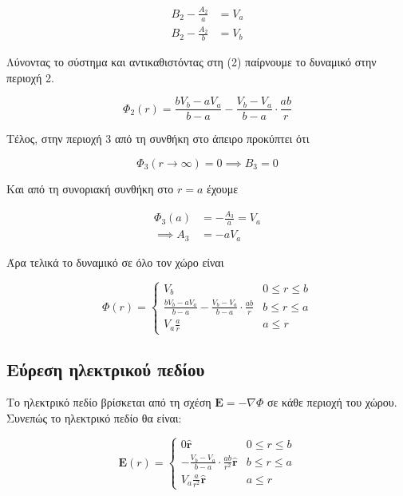 \begin{equation} \label{eq1}
\begin{split}
  B_{2} - \frac{A_{2}}{a} & = V_{a} \\
  B_{2} - \frac{A_{2}}{b} & = V_{b}
\end{split}
\end{equation}

Λύνοντας το σύστημα και αντικαθιστόντας στη (2) παίρνουμε το δυναμικό στην περιοχή 2.

\[ \Phi_{2}(r) = \frac{bV_{b} - aV_{a}}{b - a} - \frac{V_{b} - V_{a}}{b-a}\cdot\frac{ab}{r} \]

Τέλος, στην περιοχή 3 από τη συνθήκη στο άπειρο προκύπτει ότι

\[ \Phi_{3}(r\to\infty) = 0 \implies B_{3} = 0 \]

Και από τη συνοριακή συνθήκη στο $r = a$ έχουμε

\begin{equation} \label{eq1}
\begin{split}
     \Phi_{3}(a) & = -\frac{A_{3}}{a} = V_{a} \\
  \implies A_{3} & = -aV_{a}
\end{split}
\end{equation}

Άρα τελικά το δυναμικό σε όλο τον χώρο είναι

\[ \Phi(r) = \left\{
              \begin{array}{lr}
                V_{b}                                                                         & 0 \leq r \leq b \\
                \frac{bV_{b} - aV_{a}}{b - a} - \frac{V_{b} - V_{a}}{b-a}\cdot\frac{ab}{r}    & b \leq r \leq a \\
                V_{a}\frac{a}{r}                                                              & a \leq r
              \end{array}
            \right.
\]

\subsection{Εύρεση ηλεκτρικού πεδίου}

Το ηλεκτρικό πεδίο βρίσκεται από τη σχέση $\textbf{E} = -\nabla \Phi$ σε κάθε
περιοχή του χώρου. Συνεπώς το ηλεκτρικό πεδίο θα είναι:

\[ \textbf{E}(r) = \left\{
              \begin{array}{lr}
                0\hat{\mathbf{r}}                                                & 0 \leq r \leq b \\
                -\frac{V_{b} - V_{a}}{b-a}\cdot\frac{ab}{r^{2}}\hat{\mathbf{r}}  & b \leq r \leq a \\
                V_{a}\frac{a}{r^{2}}\hat{\mathbf{r}}                             & a \leq r
              \end{array}
            \right.
\]

